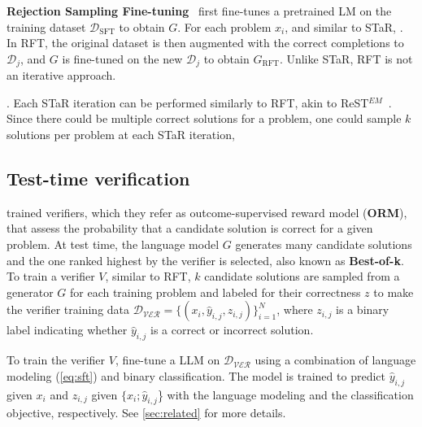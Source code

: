 \textbf{Rejection Sampling Fine-tuning}~\citep[RFT;][]{yuan2023scaling} first fine-tunes a pretrained LM on the training dataset $\mathcal{D}_{\text{SFT}}$ to obtain $G$. For each problem $x_i$,  and similar to STaR, . In RFT, the original dataset is then augmented with the correct completions to $\mathcal{D}_j$, and $G$ is fine-tuned on the new $\mathcal{D}_j$ to obtain $G_{\text{RFT}}$. Unlike STaR, RFT is not an iterative approach.

\textbf{\stardag}. Each STaR iteration can be performed similarly to RFT, akin to ReST$^{EM}$~\citep{singh2023human}. Since there could be multiple correct solutions for a problem, one could sample $k$ solutions per problem at each STaR iteration, 




\subsection{Test-time verification}
\label{sec:orm}
\citet{DBLP:journals/corr/abs-2110-14168} trained verifiers, which they refer as outcome-supervised reward model (\textbf{ORM}), that assess the probability that a candidate solution is correct for a given problem.  At test time, 
the language model $G$ generates many candidate solutions and the one ranked highest by the verifier is selected, also known as \textbf{Best-of-k}. To train a verifier $V$, similar to RFT, $k$
 candidate solutions are sampled from a generator $G$ for each training problem and labeled for their correctness $z$ to make the verifier training data $\mathcal{D_\text{VER}} = \{(x_i, \hat{y}_{i,j}, z_{i,j})\}_{i=1}^{N}$, where $z_{i,j}$ is a binary label indicating whether $\hat{y}_{i,j}$ is a correct or incorrect solution. 
 
To train the verifier $V$, \citet{DBLP:journals/corr/abs-2110-14168} fine-tune a LLM on $\mathcal{D_\text{VER}}$ using a combination of language modeling (\autoref{eq:sft}) and binary classification. The model is trained to predict $\hat{y}_{i,j}$
 given $x_i$ and $z_{i,j}$ given $\{x_i;\hat{y}_{i,j}$\} with the language modeling and the classification objective, respectively. See \autoref{sec:related} for more details.


